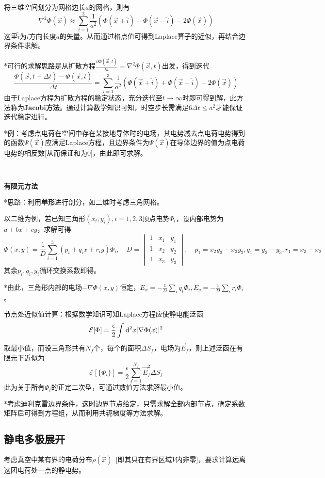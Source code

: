 \documentclass[a4paper,UTF8,fontset=windows]{ctexart}
\newcommand*{\dr}{\hspace{0.07em}\mathrm{d}}
\newcommand*{\ve}{\vec{E}}
\newcommand*{\vx}{\vec{x}}
\newcommand*{\pt}[2][t]{\frac{\partial #2}{\partial #1}}
\begin{document}
将三维空间划分为网格边长$a$的网格，则有
$$\nabla^2\Phi(\vx)\approx\sum_{i=1}^3\frac{1}{a^2}(\Phi(\vx+\tilde{i})+\Phi(\vx-\tilde{i})-2\Phi(\vx))$$
这里$\tilde{i}$为$i$方向长度$a$的矢量。从而通过格点值可得到Laplace算子的近似，再结合边界条件求解。

*可行的求解思路是从扩散方程$\pt{\Phi(\vx,t)}=\nabla^2\Phi(\vx,t)$出发，得到迭代
$$\frac{\Phi(\vx,t+\Delta t)-\Phi(\vx,t)}{\Delta t}=\sum_{i=1}^3\frac{1}{a^2}(\Phi(\vx+\tilde{i})+\Phi(\vx-\tilde{i})-2\Phi(\vx))$$
由于Laplace方程为扩散方程的稳定状态，充分迭代至$t\to\infty$时即可得到解，此方法称为\textbf{Jacobi方法}。通过计算数学知识可知，时空步长需满足$6\Delta t\le a^2$才能保证迭代稳定进行。

*例：考虑点电荷在空间中存在某接地导体时的电场，其电势减去点电荷电势得到的函数$\Psi(\vx)$应满足Laplace方程，且边界条件为$\Psi(\vx)$在导体边界的值为点电荷电势的相反数[从而保证和为0]，由此即可求解。

\

\textbf{有限元方法}

*思路：利用\textbf{单形}进行剖分，如二维时考虑三角网格。

以二维为例，若已知三角形$(x_i,y_i),i=1,2,3$顶点电势$\Phi_i$，设内部电势为$a+bx+cy$，求解可得
$$\Phi(x,y)=\frac{1}{D}\sum_{i=1}^3(p_i+q_ix+r_iy)\Phi_i,\quad D=\begin{vmatrix}1&x_1&y_1\\1&x_2&y_2\\1&x_3&y_3\end{vmatrix},\quad p_1=x_2y_3-x_3y_2,q_1=y_2-y_3,r_1=x_3-x_2$$
其余$p_i,q_i,y_i$循环交换系数即得。

*由此，三角形内部的电场$-\nabla\Phi(x,y)$恒定，$E_x=-\frac{1}{D}\sum_iq_i\Phi_i,E_y=-\frac{1}{D}\sum_ir_i\Phi_i$。

节点处近似值计算：根据数学知识可知Laplace方程应使静电能泛函
$$\mathcal{E}[\Phi]=\frac{\epsilon}{2}\int\dr^2x|\nabla\Phi(\vx)|^2$$
取最小值，而设三角形共有$N_f$个，每个的面积$\Delta S_f$，电场为$\ve_f$，则上述泛函在有限元下近似为
$$\mathcal{E}[\{\Phi_i\}]=\frac{\epsilon}{2}\sum_{f=1}^{N_f}\ve_f^2\Delta S_f$$
此为关于所有$\Phi_i$的正定二次型，可通过数值方法求解最小值。

*考虑迪利克雷边界条件，这时边界节点给定，只需求解全部内部节点，确定系数矩阵后可得到方程组，从而利用共轭梯度等方法求解。

\subsection{静电多极展开}
考虑真空中某有界的电荷分布$\rho(\vx)$\ [即其只在有界区域$V$内非零]，要求计算远离这团电荷处一点的静电势。
\end{document}
